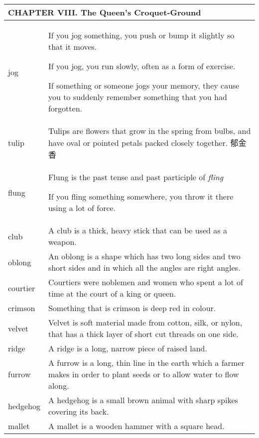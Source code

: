 \documentclass{article}
\begin{document}
\begin{center}
\begin{longtable}{|l|p{9cm}|}
\hline
\multicolumn{2}{|l|}{\textbf{CHAPTER VIII. The Queen's Croquet-Ground}}\\

\hline
jog
&
If you jog something, you push or bump it slightly so that it moves.
\par
If you jog, you run slowly, often as a form of exercise.
\par
If something or someone jogs your memory, they cause you to suddenly remember something that you had forgotten.
\\

\hline
tulip
&
Tulips are flowers that grow in the spring from bulbs, and have oval or pointed petals packed closely together. 郁金香
\\


\hline
flung
&
Flung is the past tense and past participle of \textit{fling}
\par
If you fling something somewhere, you throw it there using a lot of force.
\\

\hline
club
&
A club is a thick, heavy stick that can be used as a weapon.
\\

\hline
oblong
&
An oblong is a shape which has two long sides and two short sides and in which all the angles are right angles.
\\

\hline
courtier
&
Courtiers were noblemen and women who spent a lot of time at the court of a king or queen.
\\

\hline
crimson
&
Something that is crimson is deep red in colour.
\\

\hline
velvet
&
Velvet is soft material made from cotton, silk, or nylon, that has a thick layer of short cut threads on one side.
\\

\hline
ridge
&
A ridge is a long, narrow piece of raised land.
\\

\hline
furrow
&
A furrow is a long, thin line in the earth which a farmer makes in order to plant seeds or to allow water to flow along.
\\

\hline
hedgehog
&
A hedgehog is a small brown animal with sharp spikes covering its back.
\\

\hline
mallet
&
A mallet is a wooden hammer with a square head.
\\


\end{longtable}
\end{center}
\end{document}

